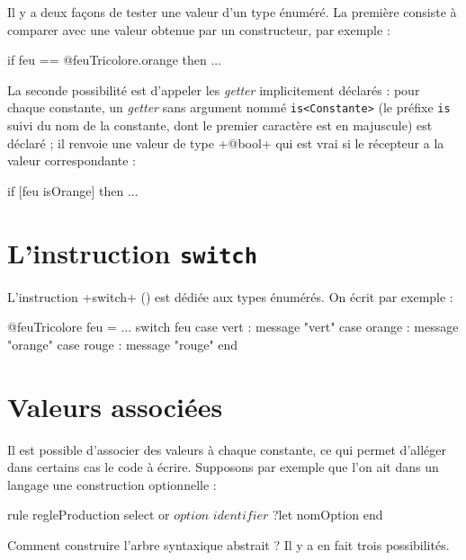 
Il y a deux façons de tester une valeur d'un type énuméré. La première consiste à comparer avec une valeur obtenue par un constructeur, par exemple :
\begin{galgas}
  if feu == @feuTricolore.orange then ...
\end{galgas}

La seconde possibilité est d'appeler les \emph{getter} implicitement déclarés : pour chaque constante, un \emph{getter} sans argument nommé  \texttt{is<Constante>} (le préfixe \texttt{is} suivi du nom de la constante, dont le premier caractère est en majuscule) est déclaré ; il renvoie une valeur de type \ggs+@bool+ qui est vrai si le récepteur a la valeur correspondante :
\begin{galgas}
  if [feu isOrange] then ...
\end{galgas}

\section{L'instruction \texttt{switch}}

L'instruction \ggs+switch+ () est dédiée aux types énumérés. On écrit par exemple :

\begin{galgas}
@feuTricolore feu = ...
switch feu
case vert : message "vert"
case orange : message "orange"
case rouge : message "rouge" 
end
\end{galgas}











\section{Valeurs associées}

Il est possible d'associer des valeurs à chaque constante, ce qui permet d'alléger dans certains cas le code à écrire. Supposons par exemple que l'on ait dans un langage une construction optionnelle :

\begin{galgas}
rule regleProduction {
  select
  or
    $option$
    $identifier$ ?let nomOption
  end
}
\end{galgas}

Comment construire l'arbre syntaxique abstrait ? Il y a en fait trois possibilités.

